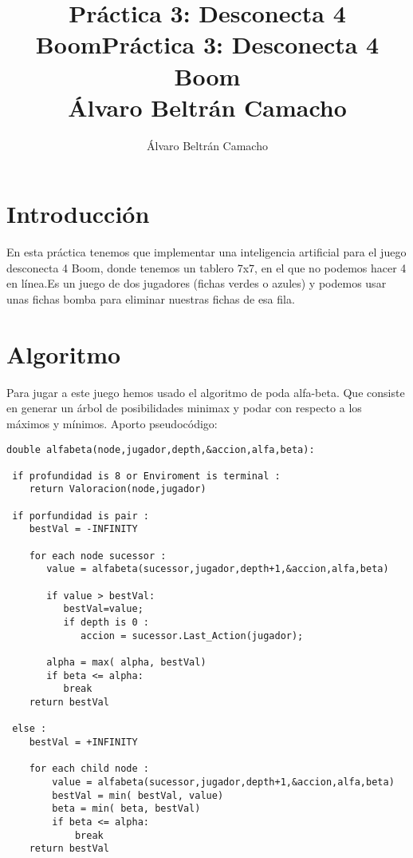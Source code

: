 \documentclass[11pt,a4paper]{article}
\author{Álvaro Beltrán Camacho}
\title{Práctica 3: Desconecta 4 Boom}
\begin{document}
\title{Práctica 3: Desconecta 4 Boom\\
	\large Álvaro Beltrán Camacho}
\author{}
\date{}

\maketitle
\tableofcontents

\newpage


\section{Introducción}
En esta práctica tenemos que implementar una inteligencia artificial para el juego desconecta 4 Boom, donde tenemos un tablero 7x7, en el que no podemos hacer 4 en línea.Es un juego de dos jugadores (fichas verdes o azules) y podemos usar unas fichas bomba para eliminar nuestras fichas de esa fila.  
\\

\section{Algoritmo}
Para jugar a este juego hemos usado el algoritmo de poda alfa-beta. Que consiste en generar un árbol de posibilidades minimax y podar con respecto a los máximos y mínimos. Aporto pseudocódigo:

\lstset{language=C}
\begin{lstlisting}[basicstyle=\small] 	
double alfabeta(node,jugador,depth,&accion,alfa,beta):

 if profundidad is 8 or Enviroment is terminal :
 	return Valoracion(node,jugador)
    
 if porfundidad is pair :
    bestVal = -INFINITY 
        
    for each node sucessor :
       value = alfabeta(sucessor,jugador,depth+1,&accion,alfa,beta)
            
       if value > bestVal:
          bestVal=value;
          if depth is 0 :
             accion = sucessor.Last_Action(jugador);				
			 
       alpha = max( alpha, bestVal)
       if beta <= alpha:
          break
    return bestVal

 else :
    bestVal = +INFINITY 
        
    for each child node :
    	value = alfabeta(sucessor,jugador,depth+1,&accion,alfa,beta)
        bestVal = min( bestVal, value) 
        beta = min( beta, bestVal)
        if beta <= alpha:
        	break
    return bestVal
\end{lstlisting}
\end{document}
